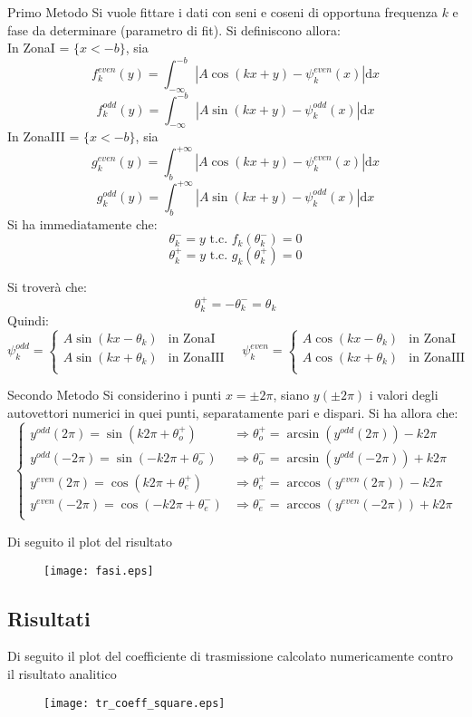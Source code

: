 \begin{paragraph}{Primo Metodo}
Si vuole fittare i dati con seni e coseni di opportuna frequenza $k$
e fase da determinare (parametro di fit). Si definiscono allora:\\
  In ZonaI = $\{x<-b\}$, sia
        $$f^{even}_k(y) = \int_{-\infty}^{-b} | A\cos(kx+y)-\psi_k^{even}(x)| \mathrm d x $$
        $$f^{odd}_k(y) = \int_{-\infty}^{-b} | A\sin(kx+y)-\psi_k^{odd}(x)| \mathrm d x $$
  In ZonaIII = $\{x<-b\}$, sia
        $$g^{even}_k(y) = \int_{b}^{+\infty} |A\cos(kx+y)-\psi_k^{even}(x)| \mathrm d x $$
        $$g^{odd}_k(y) = \int_{b}^{+\infty} |A\sin(kx+y)-\psi_k^{odd}(x)| \mathrm d x $$
Si ha immediatamente che:
    $$ \theta^-_k = y \mbox{ t.c. } f_k(\theta^-_k) = 0 $$
    $$ \theta^+_k = y \mbox{ t.c. } g_k(\theta^+_k) = 0 $$
\end{paragraph}
Si troverà che:
    $$ \theta^+_k = -\theta^-_k = \theta_k $$
Quindi:
$$ \psi_k^{odd} = \begin{cases}
    A\sin(kx - \theta_k) & \mbox{in ZonaI} \\
    A\sin(kx + \theta_k) & \mbox{in ZonaIII} \\
\end{cases}
\quad
\psi_k^{even} = \begin{cases}
    A\cos(kx - \theta_k) & \mbox{in ZonaI} \\
    A\cos(kx + \theta_k) & \mbox{in ZonaIII} \\
\end{cases}
$$

\begin{paragraph}{Secondo Metodo}
Si considerino i punti $x = \pm 2\pi$, siano $y(\pm 2\pi)$ i valori degli autovettori
numerici in quei punti, separatamente pari e dispari. Si ha allora che:
$$ \begin{cases}
    y^{odd}(2\pi)   = \sin(k2\pi  + \theta_o^+)  & \Rightarrow \theta_o^+ = \arcsin(y^{odd}(2\pi)) - k2\pi\\
    y^{odd}(-2\pi)  = \sin(-k2\pi + \theta_o^-)  & \Rightarrow \theta_o^- = \arcsin(y^{odd}(-2\pi)) + k2\pi\\
    y^{even}(2\pi)  = \cos(k2\pi  + \theta_e^+)  & \Rightarrow \theta_e^+ = \arccos(y^{even}(2\pi)) - k2\pi\\
    y^{even}(-2\pi) = \cos(-k2\pi + \theta_e^-)  & \Rightarrow \theta_e^- = \arccos(y^{even}(-2\pi)) + k2\pi\\
\end{cases}$$
\end{paragraph}
Di seguito il plot del risultato\\
\begin{figure}[h]
  \centering
  \texttt{[image: fasi.eps]}
\end{figure}
%
\newpage
\subsection*{Risultati}
Di seguito il plot del coefficiente di trasmissione calcolato numericamente contro
il risultato analitico

\begin{figure}[h]
  \texttt{[image: tr\_coeff\_square.eps]}
\end{figure}
